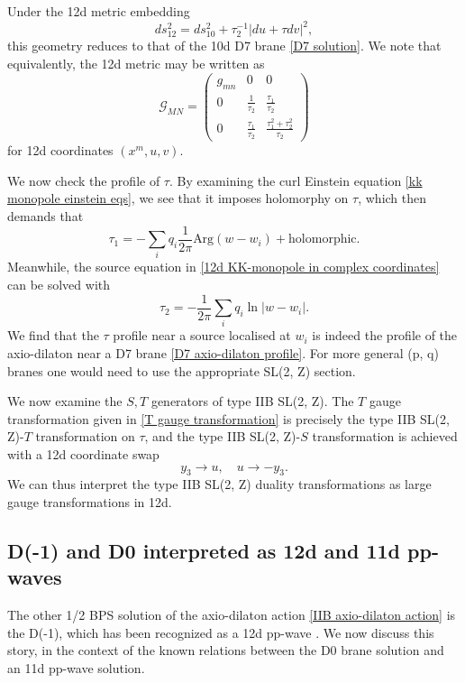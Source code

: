 Under the 12d metric embedding
\begin{equation}
ds_{12}^2 = ds_{10}^2+\tau_2^{-1}|du+\tau dv|^2,
\end{equation}
this geometry reduces to that of the 10d D7 brane \eqref{D7 solution}.
We note that equivalently, the 12d metric may be written as
\begin{equation}
\mathcal{G}_{MN}=\begin{pmatrix}
g_{mn} & 0 &0 \\
0 & \frac{1}{\tau_2} & \frac{\tau_1}{\tau_2}\\
0 & \frac{\tau_1}{\tau_2} & \frac{\tau_1^2+\tau_2^2}{\tau_2}
\end{pmatrix}
\label{12d metric ansatz 0}
\end{equation}
for 12d coordinates $(x^m,u,v)$.

We now check the profile of $\tau$.
By examining the curl Einstein equation \eqref{kk monopole einstein eqs}, we see that it imposes holomorphy on $\tau$, which then demands that
\begin{equation}
\tau_1= -\sum_i q_i \frac{1}{2\pi}\text{Arg}(w-w_i) + \text{holomorphic}.
\end{equation}
Meanwhile, the source equation in \eqref{12d KK-monopole in complex coordinates} can be solved with
\begin{equation}
\tau_2=-\frac{1}{2\pi}\sum_i q_i \ln |w-w_i|.
\end{equation}
We find that the $\tau$ profile near a source localised at $w_i$ is indeed the profile of the axio-dilaton near a D7 brane \eqref{D7 axio-dilaton profile}. 
For more general (p, q) branes one would need to use the appropriate SL(2, Z) section.

We now examine the $S,T$ generators of type IIB SL(2, Z).
The $T$ gauge transformation given in \eqref{T gauge transformation} is precisely the type IIB SL(2, Z)-$T$ transformation on $\tau$, and the type IIB SL(2, Z)-$S$ transformation is achieved with a 12d coordinate swap
\begin{equation}
y_3\to u, \quad
u\to -y_3 .
\end{equation}
We can thus interpret the type IIB SL(2, Z) duality transformations as large gauge transformations in 12d.

\subsection{D(-1) and D0 interpreted as 12d and 11d pp-waves}
The other 1/2 BPS solution of the axio-dilaton action \eqref{IIB axio-dilaton action} is the D(-1), which has been recognized as a 12d pp-wave \cite{Tseytlin:1996ne}.
We now discuss this story, in the context of the known relations between the D0 brane solution and an 11d pp-wave solution.

